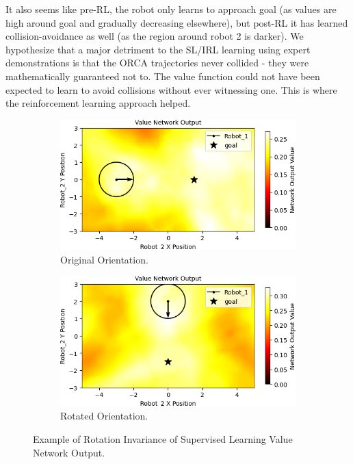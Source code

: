 \documentclass[conference]{IEEEtran}
\begin{document}
It also seems like pre-RL, the robot only learns to approach goal (as values are high around goal and gradually decreasing elsewhere), but post-RL it has learned collision-avoidance as well (as the region around robot 2 is darker). We hypothesize that a major detriment to the SL/IRL learning using expert demonstrations is that the ORCA trajectories never collided - they were mathematically guaranteed not to. The value function could not have been expected to learn to avoid collisions without ever witnessing one. This is where the reinforcement learning approach helped.
\begin{figure}[t!]
    \centering
    \begin{subfigure}[b]{0.49\textwidth}
         \centering
         \includegraphics[width=\textwidth]{docs/latex/figures/heatmap_x_Robot_2.png}
         \caption{Original Orientation.}
         \label{fig:heatmap_x}
     \end{subfigure}
     \hfill
     \begin{subfigure}[b]{0.49\textwidth}
         \centering
         \includegraphics[width=\textwidth]{docs/latex/figures/heatmap_y_Robot_2.png}
         \caption{Rotated Orientation.}
         \label{fig:heatmap_y}
     \end{subfigure}
     \caption{Example of Rotation Invariance of Supervised Learning Value Network Output.}\label{fig:heatmap_rot}
\end{figure}
\end{document}
